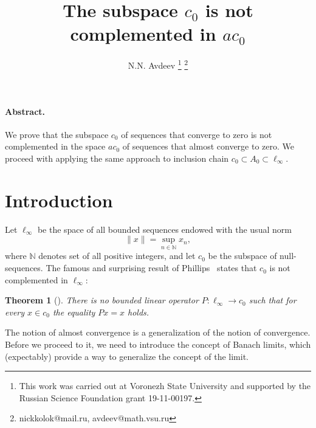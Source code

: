 \documentclass[a4paper,14pt]{article} %
\theoremstyle{plain}
\newtheorem{theorem}{Theorem}[section]
\theoremstyle{definition}
\begin{document}

\title{
	The subspace $c_0$ is not complemented in $ac_0$
}

\author{
	N.N. Avdeev
	\footnote{
		This work was carried out at Voronezh State University and supported by the Russian Science
		Foundation grant 19-11-00197.
	}
	\footnote{nickkolok@mail.ru, avdeev@math.vsu.ru}
}

\maketitle

\paragraph{Abstract.}
We prove that the subspace $c_0$ of sequences that converge to zero
is not complemented in the space $ac_0$ of sequences that almost converge to zero.
We proceed with applying the same approach to inclusion chain $c_0\subset A_0 \subset \ell_\infty$.




\section{Introduction}

Let $\ell_\infty$ be the space of all bounded sequences
endowed with the usual norm
\begin{equation}
	\|x\| = \sup_{n\in\mathbb{N}} x_n
	,
\end{equation}
where $\mathbb{N}$ denotes set of all positive integers,
and let $c_0$ be the subspace  of null-sequences.
The famous and surprising result of Phillips~\cite{phillips1940linear}
states that $c_0$ is not complemented in $\ell_\infty$:

\begin{theorem}[\cite{phillips1940linear}]
	\label{thm:phillips}
	There is no bounded linear operator $P: \ell_\infty \to c_0$ such that for every
	$x \in c_0$ the equality $Px =x$ holds.
\end{theorem}

The notion of almost convergence is a generalization of the notion of convergence.
Before we proceed to it, we need to introduce the concept of Banach limits,
which (expectably) provide a way to generalize the concept of the limit.
\end{document}
